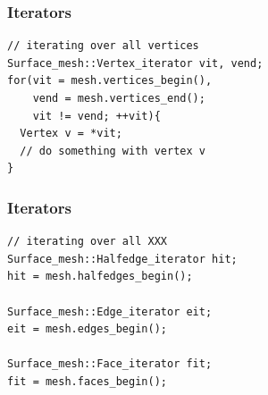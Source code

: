 
\begin{frame}
\end{frame}


\begin{frame}[fragile]
\frametitle{Iterators}
\begin{lstlisting}
// iterating over all vertices
Surface_mesh::Vertex_iterator vit, vend;
for(vit = mesh.vertices_begin(),
    vend = mesh.vertices_end();
    vit != vend; ++vit){
  Vertex v = *vit;
  // do something with vertex v
}
\end{lstlisting}
\end{frame}

\begin{frame}[fragile]
\frametitle{Iterators}
\begin{lstlisting}
// iterating over all XXX
Surface_mesh::Halfedge_iterator hit;
hit = mesh.halfedges_begin();

Surface_mesh::Edge_iterator eit;
eit = mesh.edges_begin();

Surface_mesh::Face_iterator fit;
fit = mesh.faces_begin();
\end{lstlisting}
\end{frame}

\begin{frame}
\end{frame}

